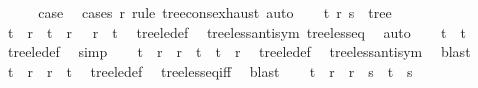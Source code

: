 \begin{isabellebody}
\ \ \isamarkupfalse%
\ \isamarkupfalse%
\ {\isacharquery}{\kern0pt}case\ \isamarkupfalse%
\ {\isacharparenleft}{\kern0pt}cases\ r\ rule{\isacharcolon}{\kern0pt}\ tree{\isacharunderscore}{\kern0pt}cons{\isacharunderscore}{\kern0pt}exhaust{\isacharparenright}{\kern0pt}\ auto\isanewline
{}\isamarkupfalse%
%
\endisatagproof
{\isafoldproof}%
%
\isadelimproof
\isanewline
%
\endisadelimproof
\isanewline
{}\isamarkupfalse%
\isanewline
%
\isadelimproof
%
\endisadelimproof
%
\isatagproof
{}\isamarkupfalse%
\isanewline
\ \ \isamarkupfalse%
\ t\ r\ s\ {\isacharcolon}{\kern0pt}{\isacharcolon}{\kern0pt}\ tree\isanewline
\ \ \isamarkupfalse%
\ {\isachardoublequoteopen}t\ {\isacharless}{\kern0pt}\ r\ {\isasymlongleftrightarrow}\ t\ {\isasymle}\ r\ {\isasymand}\ {\isasymnot}\ r\ {\isasymle}\ t{\isachardoublequoteclose}\ \isamarkupfalse%
\ tree{\isacharunderscore}{\kern0pt}le{\isacharunderscore}{\kern0pt}def\ \isamarkupfalse%
\ tree{\isacharunderscore}{\kern0pt}less{\isacharunderscore}{\kern0pt}antisym\ tree{\isacharunderscore}{\kern0pt}less{\isacharunderscore}{\kern0pt}eq\ \isamarkupfalse%
\ auto\isanewline
\ \ \isamarkupfalse%
\ {\isachardoublequoteopen}t\ {\isasymle}\ t{\isachardoublequoteclose}\ \isamarkupfalse%
\ tree{\isacharunderscore}{\kern0pt}le{\isacharunderscore}{\kern0pt}def\ \isamarkupfalse%
\ simp\isanewline
\ \ \isamarkupfalse%
\ {\isachardoublequoteopen}t\ {\isasymle}\ r\ {\isasymLongrightarrow}\ r\ {\isasymle}\ t\ {\isasymLongrightarrow}\ t\ {\isacharequal}{\kern0pt}\ r{\isachardoublequoteclose}\ \isamarkupfalse%
\ tree{\isacharunderscore}{\kern0pt}le{\isacharunderscore}{\kern0pt}def\ \isamarkupfalse%
\ tree{\isacharunderscore}{\kern0pt}less{\isacharunderscore}{\kern0pt}antisym\ \isamarkupfalse%
\ blast\isanewline
\ \ \isamarkupfalse%
\ {\isachardoublequoteopen}t\ {\isasymle}\ r\ {\isasymor}\ r\ {\isasymle}\ t{\isachardoublequoteclose}\ \isamarkupfalse%
\ tree{\isacharunderscore}{\kern0pt}le{\isacharunderscore}{\kern0pt}def\ \isamarkupfalse%
\ tree{\isacharunderscore}{\kern0pt}less{\isacharunderscore}{\kern0pt}eq{\isacharunderscore}{\kern0pt}iff\ \isamarkupfalse%
\ blast\isanewline
\ \ \isamarkupfalse%
\ {\isachardoublequoteopen}t\ {\isasymle}\ r\ {\isasymLongrightarrow}\ r\ {\isasymle}\ s\ {\isasymLongrightarrow}\ t\ {\isasymle}\ s{\isachardoublequoteclose}\ \isamarkupfalse%

\end{isabellebody}
